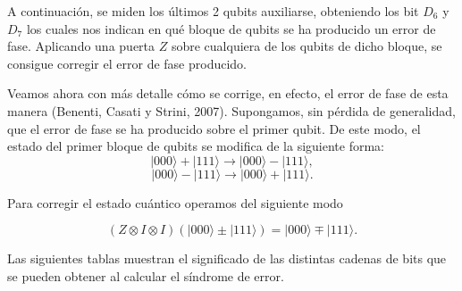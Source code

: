 A continuación, se miden los últimos 2 qubits auxiliarse, obteniendo los bit $D_6$ y $D_7$ los cuales nos indican en qué bloque de qubits se ha producido un error de fase. Aplicando una puerta $Z$ sobre cualquiera de los qubits de dicho bloque, se consigue corregir el error de fase producido.

Veamos ahora con más detalle cómo se corrige, en efecto, el error de fase de esta manera (Benenti, Casati y Strini, 2007).  Supongamos, sin pérdida de generalidad, que el error de fase se ha producido sobre el primer qubit. De este modo, el estado del primer bloque de qubits se modifica de la siguiente forma:
$$ | 000 \rangle + | 111 \rangle \to | 000 \rangle - | 111 \rangle , $$
$$ | 000 \rangle - | 111 \rangle \to | 000 \rangle + | 111 \rangle . $$

Para corregir el estado cuántico operamos del siguiente modo

$$ ( Z \otimes I \otimes I ) ( | 000 \rangle \pm | 111 \rangle ) = | 000 \rangle \mp  | 111 \rangle .$$

Las siguientes tablas muestran el significado de las distintas cadenas de bits que se pueden obtener al calcular el síndrome de error. 

